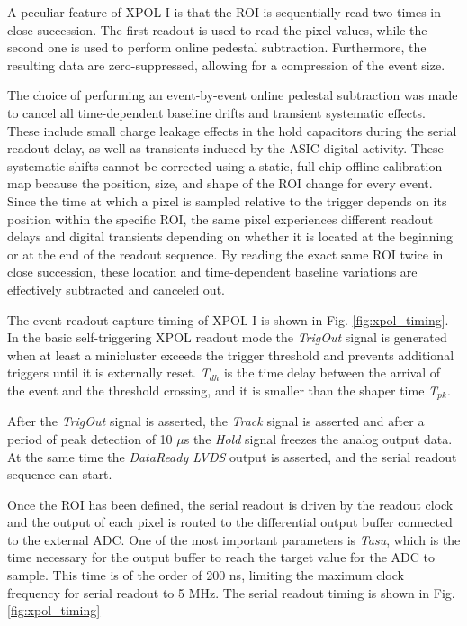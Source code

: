 A peculiar feature of XPOL-I is that the ROI is sequentially read two times in close succession. The first readout is used to read the pixel values, while the second one is used to perform online pedestal subtraction. Furthermore, the resulting data are zero-suppressed, allowing for a compression of the event size.

The choice of performing an event-by-event online pedestal subtraction was made to cancel all time-dependent baseline drifts and transient systematic effects. These include small charge leakage effects in the hold capacitors during the serial readout delay, as well as transients induced by the ASIC digital activity. These systematic shifts cannot be corrected using a static, full-chip offline calibration map because the position, size, and shape of the ROI change for every event. Since the time at which a pixel is sampled relative to the trigger depends on its position within the specific ROI, the same pixel experiences different readout delays and digital transients depending on whether it is located at the beginning or at the end of the readout sequence. By reading the exact same ROI twice in close succession, these location and time-dependent baseline variations are effectively subtracted and canceled out.

The event readout capture timing of XPOL-I is shown in Fig. \ref{fig:xpol_timing}. In the basic self-triggering XPOL readout mode the \textit{TrigOut} signal is generated when at least a minicluster exceeds the trigger threshold and prevents additional triggers until it is externally reset. \textit{T$_{dh}$} is the time delay between the arrival of the event and the threshold crossing, and it is smaller than the shaper time \textit{T$_{pk}$}.

After the \textit{TrigOut} signal is asserted, the \textit{Track} signal is asserted and after a period of peak detection of 10 $\mu$s the \textit{Hold} signal freezes the analog output data. At the same time the \textit{DataReady LVDS} output is asserted, and the serial readout sequence can start.

Once the ROI has been defined, the serial readout is driven by the readout clock and the output of each pixel is routed to the differential output buffer connected to the external ADC. One of the most important parameters is \textit{Tasu}, which is the time necessary for the output buffer to reach the target value for the ADC to sample. This time is of the order of 200 ns, limiting the maximum clock frequency for serial readout to 5 MHz. The serial readout timing is shown in Fig. \ref{fig:xpol_timing}

